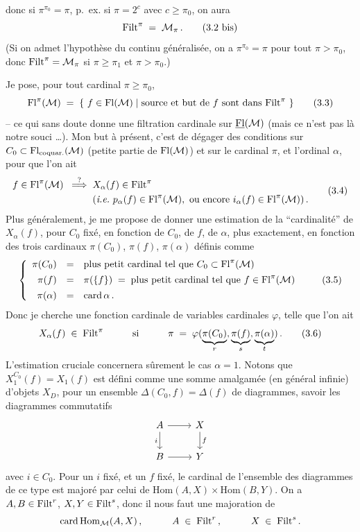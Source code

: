 donc si $\pi^{\pi_0}=\pi$, p.~ex. si $\pi=2^c$ avec $c\geq\pi_0$, on aura
\[
\mathrm{Filt}^\pi \;=\; \mathcal{M}_\pi\,.
\tag*{(3.2 bis)}
\]
(Si on admet l'hypothèse du continu généralisée, on a $\pi^{\pi_0}=\pi$ pour tout $\pi>\pi_0$, donc $\mathrm{Filt}^\pi=\mathcal{M}_\pi$ si $\pi\geq\pi_1$ et $\pi>\pi_0$.)

Je pose, pour tout cardinal $\pi\geq\pi_0$,
\[
\mathrm{Fl}^\pi(\mathcal{M}) \;=\; \{\ f\in\mathrm{Fl}(\mathcal{M}) \mid \text{source et but de $f$ sont dans } \mathrm{Filt}^\pi\ \}
\tag*{(3.3)}
\]
-- ce qui sans doute donne une filtration cardinale sur $\underline{\mathrm{Fl}}(\mathcal{M})$ (mais ce n'est pas là notre souci \ldots). Mon but à présent, c'est de dégager des conditions sur $C_0\subset\mathrm{Fl}_{\text{coquar.}}(\mathcal{M})$ (petite partie de $\mathrm{Fl}(\mathcal{M})$) et sur le cardinal $\pi$, et l'ordinal $\alpha$, pour que l'on ait
\[
\begin{aligned}
f\in\mathrm{Fl}^\pi(\mathcal{M}) \;\;\overset{?}{\Longrightarrow}\;\; & X_\alpha(f)\in\mathrm{Filt}^\pi \\
& (\textit{i.e.}\ p_\alpha(f)\in\mathrm{Fl}^\pi(\mathcal{M}),\ \text{ou encore } i_\alpha(f)\in\mathrm{Fl}^\pi(\mathcal{M}))\,.
\end{aligned}
\tag*{(3.4)}
\]
Plus généralement, je me propose de donner une estimation de la ``cardinalité'' de $X_\alpha(f)$, pour $C_0$ fixé, en fonction de $C_0$, de $f$, de $\alpha$, plus exactement, en fonction des trois cardinaux $\pi(C_0)$, $\pi(f)$, $\pi(\alpha)$ définis comme
\[
\left\{
\begin{array}{rcl}
\pi(C_0) & = & \text{plus petit cardinal tel que } C_0\subset\mathrm{Fl}^\pi(\mathcal{M}) \\[1ex]
\pi(f) & = & \pi(\{f\}) \;=\; \text{plus petit cardinal tel que } f\in\mathrm{Fl}^\pi(\mathcal{M}) \\[1ex]
\pi(\alpha) & = & \operatorname{card}\alpha\,.
\end{array}
\right.
\tag*{(3.5)}
\]
Donc je cherche une fonction
cardinale de variables cardinales $\varphi$, telle que l'on ait
\[
X_\alpha(f) \;\in\; \mathrm{Filt}^\pi \qquad\quad \text{si} \qquad\quad \pi \;=\; \varphi(\underbrace{\pi(C_0)}_{r},\underbrace{\pi(f)}_{s},\underbrace{\pi(\alpha)}_{t})\,.
\tag*{(3.6)}
\]
L'estimation cruciale concernera sûrement le cas $\alpha=1$. Notons que $X_1^{C_0}(f)=X_1(f)$ est défini comme une somme amalgamée (en général infinie) d'objets $X_D$, pour un ensemble $\Delta(C_0,f)=\Delta(f)$ de diagrammes, savoir les diagrammes commutatifs
\[
\begin{tikzcd}
A \arrow[r] \arrow[d, "i"'] & X \arrow[d, "f"] \\
B \arrow[r] & Y
\end{tikzcd}
\]
avec $i\in C_0$. Pour un $i$ fixé, et un $f$ fixé, le cardinal de l'ensemble des diagrammes de ce type est majoré par celui de $\mathrm{Hom}(A,X)\times\mathrm{Hom}(B,Y)$. On a $A,B\in\mathrm{Filt}^r$, $X,Y\in\mathrm{Filt}^s$, donc il nous faut une majoration de
\[
\operatorname{card}\mathrm{Hom}_{\mathcal{M}}(A,X)\,, \qquad\quad A\;\in\;\mathrm{Filt}^r\,, \qquad\quad X\;\in\;\mathrm{Filt}^s\,.
\]

